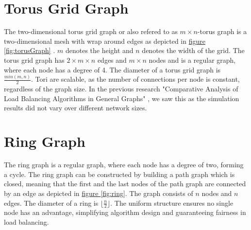 \section{Torus Grid Graph}\label{sec:2torusgridgraph}
The two-dimensional torus grid graph or also refered to as $m \times n$-torus graph is a two-dimensional mesh with wrap around edges as depicted in \hyperref[fig:torusGraph]{figure} \ref{fig:torusGraph} \cite{Mahlmann2010}. $m$ denotes the height and $n$ denotes the width of the grid. The torus grid graph has $2\times m \times n$  edges and $m \times n$ nodes and is a regular graph, where each node has a degree of 4. The diameter of a torus grid graph is $\frac{min(m,n)}{2}$. Tori are scalable, as the number of connections per node is constant, regardless of the graph size. In the previous research "Comparative Analysis of Load Balancing Algorithms in General Graphs" \cite{Bayazitoglu}, we saw this as the simulation results did not vary over different network sizes.


\section{Ring Graph}\label{sec:2ringgraph}
The ring graph is a regular graph, where each node has a degree of two, forming a cycle. The ring graph can be constructed by building a path graph which is closed, meaning that the first and the last nodes of the path graph are connected by an edge as depicted in \hyperref[fig:ring]{figure } \ref{fig:ring}. The graph consists of $n$ nodes and $n$ edges. The diameter of a ring is $\lfloor{\frac{n}{2}}\rfloor$. The uniform structure ensures no single node has an advantage, simplifying algorithm design and guaranteeing fairness in load balancing.


